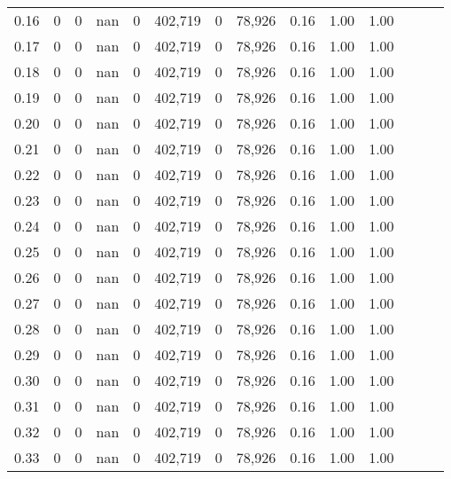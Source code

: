 \begin{tabular}{rrrrrrrrrrrrrr}
0.16 &        0 &       0 &   nan &        0 &  402,719 &       0 &  78,926 &  0.16 &  1.00 &      1.00 \\
0.17 &        0 &       0 &   nan &        0 &  402,719 &       0 &  78,926 &  0.16 &  1.00 &      1.00 \\
0.18 &        0 &       0 &   nan &        0 &  402,719 &       0 &  78,926 &  0.16 &  1.00 &      1.00 \\
0.19 &        0 &       0 &   nan &        0 &  402,719 &       0 &  78,926 &  0.16 &  1.00 &      1.00 \\
0.20 &        0 &       0 &   nan &        0 &  402,719 &       0 &  78,926 &  0.16 &  1.00 &      1.00 \\
0.21 &        0 &       0 &   nan &        0 &  402,719 &       0 &  78,926 &  0.16 &  1.00 &      1.00 \\
0.22 &        0 &       0 &   nan &        0 &  402,719 &       0 &  78,926 &  0.16 &  1.00 &      1.00 \\
0.23 &        0 &       0 &   nan &        0 &  402,719 &       0 &  78,926 &  0.16 &  1.00 &      1.00 \\
0.24 &        0 &       0 &   nan &        0 &  402,719 &       0 &  78,926 &  0.16 &  1.00 &      1.00 \\
0.25 &        0 &       0 &   nan &        0 &  402,719 &       0 &  78,926 &  0.16 &  1.00 &      1.00 \\
0.26 &        0 &       0 &   nan &        0 &  402,719 &       0 &  78,926 &  0.16 &  1.00 &      1.00 \\
0.27 &        0 &       0 &   nan &        0 &  402,719 &       0 &  78,926 &  0.16 &  1.00 &      1.00 \\
0.28 &        0 &       0 &   nan &        0 &  402,719 &       0 &  78,926 &  0.16 &  1.00 &      1.00 \\
0.29 &        0 &       0 &   nan &        0 &  402,719 &       0 &  78,926 &  0.16 &  1.00 &      1.00 \\
0.30 &        0 &       0 &   nan &        0 &  402,719 &       0 &  78,926 &  0.16 &  1.00 &      1.00 \\
0.31 &        0 &       0 &   nan &        0 &  402,719 &       0 &  78,926 &  0.16 &  1.00 &      1.00 \\
0.32 &        0 &       0 &   nan &        0 &  402,719 &       0 &  78,926 &  0.16 &  1.00 &      1.00 \\
0.33 &        0 &       0 &   nan &        0 &  402,719 &       0 &  78,926 &  0.16 &  1.00 &      1.00 \\

\end{tabular}
